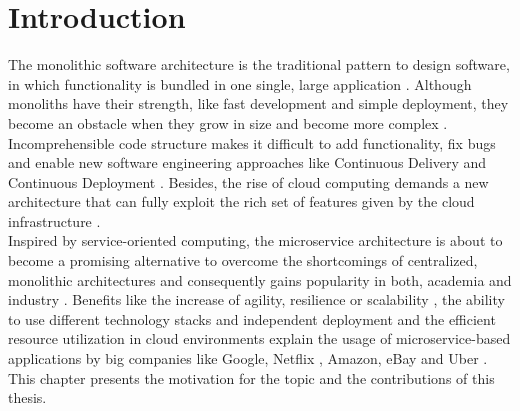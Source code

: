 
\chapter{Introduction}
\label{ch:Introduction}
The monolithic software architecture is the traditional pattern to design software, in which functionality is bundled in one single, large application \cite{DataflowDrivenChen}. Although monoliths have their strength, like fast development and simple deployment, they become an obstacle when they grow in size and become more complex \cite{infoq}. Incomprehensible code structure makes it difficult to add functionality, fix bugs and enable new software engineering approaches like Continuous Delivery and Continuous Deployment \cite{cd}. 
Besides, the rise of cloud computing demands a new architecture that can fully exploit the rich set of features given by the cloud infrastructure \cite{MigratingCloud}. \\
Inspired by service-oriented computing, the microservice architecture is about to become a promising alternative to overcome the shortcomings of centralized, monolithic architectures and consequently gains popularity in both, academia and industry \cite{ObjectAwareAmiri}. Benefits like the increase of agility, resilience or scalability \cite{FunctionalDecompositionHeinrich}, the ability to use different technology stacks and independent deployment \cite{interfaceAnalysisBaresi} and the efficient resource utilization in cloud environments \cite{MigratingCloud} explain the usage of microservice-based applications by big companies like Google, Netflix \cite{DevOps}, Amazon, eBay \cite{DataflowDrivenChen} and Uber \cite{FunctionalDecompositionHeinrich}. \\
This chapter presents the motivation for the topic and the contributions of this thesis.


